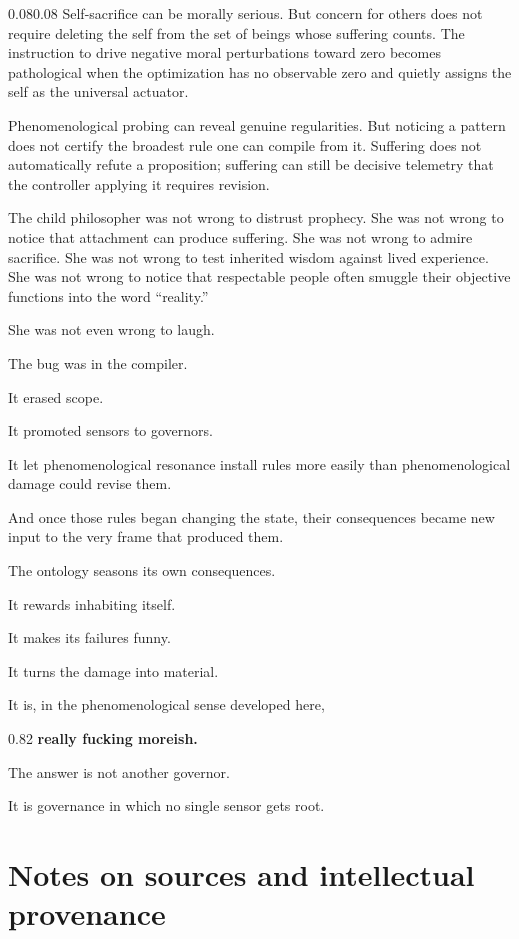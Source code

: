 \documentclass[10pt,letterpaper]{article}
\newenvironment{paperbody}
  {\begin{adjustwidth}{0.08\textwidth}{0.08\textwidth}\justifying}
  {\par\end{adjustwidth}}
\newenvironment{thesisbox}
  {\Needspace{3.5\baselineskip}\par\vspace{0.32em}\begin{center}\begingroup
   \begin{lrbox}{\thesisboxsave}\begin{varwidth}{0.82\linewidth}
   \normalsize\rmfamily\bfseries\upshape\RaggedRight}
  {\end{varwidth}\end{lrbox}\fbox{\usebox{\thesisboxsave}}
   \endgroup\end{center}\vspace{0.32em}}
\let\oldsection\section
\renewcommand{\section}{\Needspace{6\baselineskip}\oldsection}
\begin{document}
\begin{paperbody}
Self-sacrifice can be morally serious. But concern for others does not
require deleting the self from the set of beings whose suffering counts.
The instruction to drive negative moral perturbations toward zero
becomes pathological when the optimization has no observable zero and
quietly assigns the self as the universal actuator.

Phenomenological probing can reveal genuine regularities. But noticing a
pattern does not certify the broadest rule one can compile from it.
Suffering does not automatically refute a proposition; suffering can
still be decisive telemetry that the controller applying it requires
revision.

The child philosopher was not wrong to distrust prophecy. She was not
wrong to notice that attachment can produce suffering. She was not wrong
to admire sacrifice. She was not wrong to test inherited wisdom against
lived experience. She was not wrong to notice that respectable people
often smuggle their objective functions into the word ``reality.''

She was not even wrong to laugh.

The bug was in the compiler.

It erased scope.

It promoted sensors to governors.

It let phenomenological resonance install rules more easily than
phenomenological damage could revise them.

And once those rules began changing the state, their consequences became
new input to the very frame that produced them.

The ontology seasons its own consequences.

It rewards inhabiting itself.

It makes its failures funny.

It turns the damage into material.

It is, in the phenomenological sense developed here,

\begin{thesisbox}
really fucking moreish.
\end{thesisbox}

The answer is not another governor.

It is governance in which no single sensor gets root.

\bigskip

\section*{Notes on sources and intellectual
provenance}


\end{paperbody}
\end{document}
